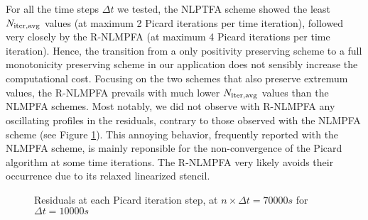 \documentclass[final,11pt]{elsarticle}
\newcounter{bla}
\begin{document}
For all the time steps $\Delta t$ we tested, the NLPTFA scheme showed the least $N_{\rm iter,\rm avg}$ values (at maximum 2 Picard iterations per time iteration), followed very closely by the R-NLMPFA (at maximum 4 Picard iterations per time iteration). Hence, the transition from a only positivity preserving scheme to a full monotonicity preserving scheme in our application does not sensibly increase the computational cost. Focusing on the two schemes that also preserve extremum values, the R-NLMPFA prevails with much lower $N_{\rm iter,\rm avg}$ values than the NLMPFA schemes. Most notably, we did not observe with R-NLMPFA any oscillating profiles in the residuals, contrary to those observed with the NLMPFA scheme (see Figure \ref{fig_residue}). This annoying behavior, frequently reported with the NLMPFA scheme, is mainly reponsible for the non-convergence of the Picard algorithm at some time iterations. The R-NLMPFA very likely avoids their occurrence due to its relaxed linearized stencil.

\begin{figure}
\begin{center}
\end{center}
\caption{Residuals at each Picard iteration step, at $n\times \Delta t=70000s$ for $\Delta t=10000s$}
\label{fig_residue}
\end{figure}
\end{document}
